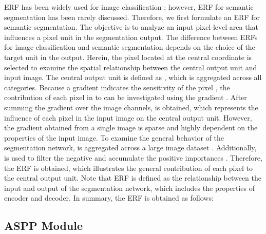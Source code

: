 \documentclass{article}
\begin{document}
ERF has been widely used for image classification \citep{DBLP:conf/nips/LuoLUZ16,DBLP:journals/prl/KimCJLJK23}; however, ERF for semantic segmentation has been rarely discussed. Therefore, we first formulate an ERF for semantic segmentation. The objective is to analyze an input pixel-level area that influences a pixel unit in the segmentation output. The difference between ERFs for image classification and semantic segmentation depends on the choice of the target unit in the output. Herein, the pixel located at the central coordinate  is selected to examine the spatial relationship between the central output unit and input image. The central output unit is defined as , which is aggregated across all categories. Because a gradient indicates the sensitivity of the pixel \citep{DBLP:journals/corr/SimonyanVZ13}, the contribution of each pixel in  to  can be investigated using the gradient . After summing the gradient over the image channels,  is obtained, which represents the influence of each pixel in the input image on the central output unit. However, the gradient obtained from a single image is sparse and highly dependent on the properties of the input image. To examine the general behavior of the segmentation network,  is aggregated across a large image dataset . Additionally,  is used to filter the negative and accumulate the positive importances \citep{DBLP:journals/ijcv/SelvarajuCDVPB20}. Therefore, the ERF  is obtained, which illustrates the general contribution of each pixel to the central output unit. Note that ERF is defined as the relationship between the input and output of the segmentation network, which includes the properties of encoder and decoder. In summary, the ERF is obtained as follows:


\subsection{ASPP Module}
\label{sec:aspp}
\end{document}
